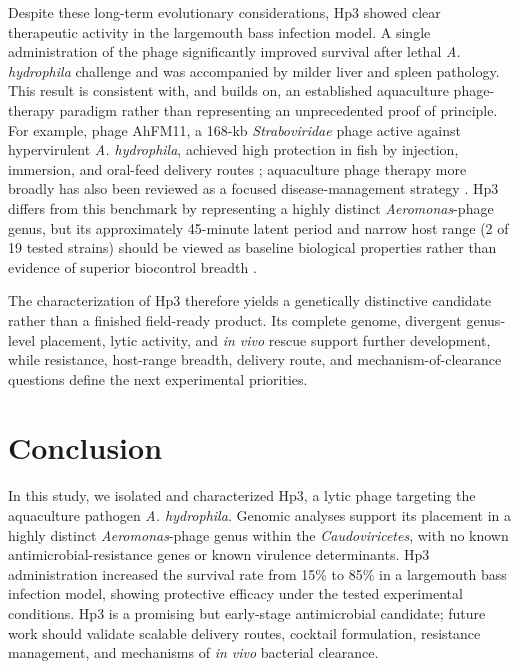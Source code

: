 \documentclass[11pt,a4paper]{article}
\begin{document}
Despite these long-term evolutionary considerations, Hp3 showed clear
therapeutic activity in the largemouth bass infection model. A single
administration of the phage significantly improved survival after lethal
\emph{A. hydrophila} challenge and was accompanied by milder liver and
spleen pathology. This result is consistent with, and builds on, an
established aquaculture phage-therapy paradigm rather than representing
an unprecedented proof of principle. For example, phage AhFM11, a
168-kb \emph{Straboviridae} phage active against hypervirulent
\emph{A. hydrophila}, achieved high protection in fish by injection,
immersion, and oral-feed delivery routes \citep{2024-Novel_MuliyaSankappa};
aquaculture phage therapy more broadly has also been reviewed as a
focused disease-management strategy \citep{2021-Phage_Ramos-Vivas}.
Hp3 differs from this benchmark by representing a highly distinct
\emph{Aeromonas}-phage genus, but its approximately 45-minute latent
period and narrow host range (2 of 19 tested strains) should be viewed
as baseline biological properties rather than evidence of superior
biocontrol breadth \citep{2022-Characterization_Bujak,
2024-Novel_MuliyaSankappa}.

The characterization of Hp3 therefore yields a genetically distinctive
candidate rather than a finished field-ready product. Its complete
genome, divergent genus-level placement, lytic activity, and \emph{in vivo}
rescue support further development, while resistance, host-range breadth,
delivery route, and mechanism-of-clearance questions define the next
experimental priorities.

\section{Conclusion}\label{conclusion}

In this study, we isolated and characterized Hp3, a lytic phage targeting
the aquaculture pathogen \emph{A. hydrophila}. Genomic analyses support
its placement in a highly distinct \emph{Aeromonas}-phage genus within
the \emph{Caudoviricetes}, with no known antimicrobial-resistance genes
or known virulence determinants. Hp3 administration increased
the survival rate from 15\% to 85\% in a largemouth bass infection
model, showing protective efficacy under the tested experimental
conditions. Hp3 is a promising but early-stage
antimicrobial candidate; future work should validate scalable delivery
routes, cocktail formulation, resistance management, and mechanisms of
\emph{in vivo} bacterial clearance.
\end{document}

